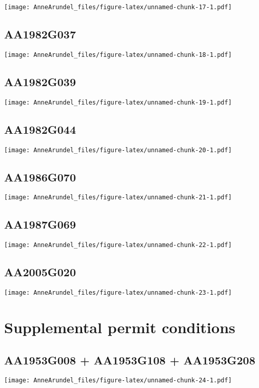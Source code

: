 \documentclass[
]{article}
\begin{document}
\texttt{[image: AnneArundel\_files/figure-latex/unnamed-chunk-17-1.pdf]}

\hypertarget{aa1982g037}{%
\subsection{AA1982G037}\label{aa1982g037}}

\texttt{[image: AnneArundel\_files/figure-latex/unnamed-chunk-18-1.pdf]}

\hypertarget{aa1982g039}{%
\subsection{AA1982G039}\label{aa1982g039}}

\texttt{[image: AnneArundel\_files/figure-latex/unnamed-chunk-19-1.pdf]}

\hypertarget{aa1982g044}{%
\subsection{AA1982G044}\label{aa1982g044}}

\texttt{[image: AnneArundel\_files/figure-latex/unnamed-chunk-20-1.pdf]}

\hypertarget{aa1986g070}{%
\subsection{AA1986G070}\label{aa1986g070}}

\texttt{[image: AnneArundel\_files/figure-latex/unnamed-chunk-21-1.pdf]}

\hypertarget{aa1987g069}{%
\subsection{AA1987G069}\label{aa1987g069}}

\texttt{[image: AnneArundel\_files/figure-latex/unnamed-chunk-22-1.pdf]}

\hypertarget{aa2005g020}{%
\subsection{AA2005G020}\label{aa2005g020}}

\texttt{[image: AnneArundel\_files/figure-latex/unnamed-chunk-23-1.pdf]}

\hypertarget{supplemental-permit-conditions}{%
\section{Supplemental permit
conditions}\label{supplemental-permit-conditions}}

\hypertarget{aa1953g008-aa1953g108-aa1953g208}{%
\subsection{AA1953G008 + AA1953G108 +
AA1953G208}\label{aa1953g008-aa1953g108-aa1953g208}}

\texttt{[image: AnneArundel\_files/figure-latex/unnamed-chunk-24-1.pdf]}
\end{document}
